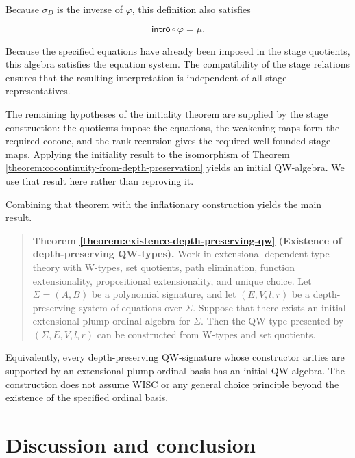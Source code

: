 \documentclass[runningheads]{llncs}
\begin{document}
Because \(\sigma_D\) is the inverse of \(\varphi\), this definition also
satisfies

\[
\mathsf{intro}\circ\varphi=\mu.
\]

Because the specified equations have already been imposed in the stage
quotients, this algebra satisfies the equation system. The compatibility
of the stage relations ensures that the resulting interpretation is
independent of all stage representatives.

The remaining hypotheses of the initiality theorem are supplied by the
stage construction: the quotients impose the equations, the weakening
maps form the required cocone, and the rank recursion gives the required
well-founded stage maps. Applying the initiality result to the isomorphism
of Theorem \ref{theorem:cocontinuity-from-depth-preservation} yields
an initial QW-algebra. We use that result here rather than reproving it.

Combining that theorem with the inflationary construction yields the main
result.

\begin{quote}
\textbf{Theorem \ref{theorem:existence-depth-preserving-qw} (Existence of depth-preserving QW-types).}\label{theorem:existence-depth-preserving-qw} Work in
extensional dependent type theory with W-types, set quotients, path
elimination, function extensionality, propositional extensionality, and
unique choice. Let \(\Sigma=(A,B)\) be a polynomial signature, and let
\((E,V,l,r)\) be a depth-preserving system of equations over \(\Sigma\).
Suppose that there exists an initial extensional plump ordinal algebra
for \(\Sigma\). Then the QW-type presented by \((\Sigma,E,V,l,r)\) can be
constructed from W-types and set quotients.
\end{quote}

Equivalently, every depth-preserving QW-signature whose constructor
arities are supported by an extensional plump ordinal basis has an
initial QW-algebra. The construction does not assume WISC or any general
choice principle beyond the existence of the specified ordinal basis.

\section{Discussion and conclusion}\label{discussion-and-conclusion}
\end{document}
